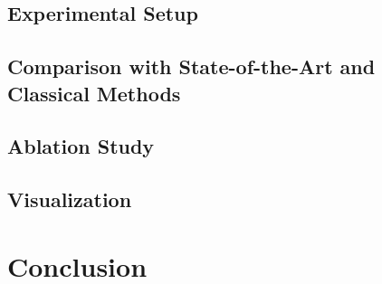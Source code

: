 \documentclass[conference]{IEEEtran}
\begin{document}

\subsection{Experimental Setup}


\subsection{Comparison with State-of-the-Art and Classical Methods}


\subsection{Ablation Study}


\subsection{Visualization}


\section{Conclusion}





\end{document}

